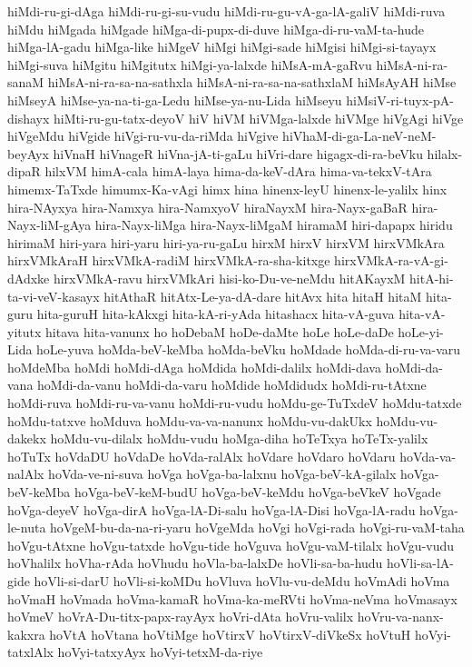 {hiMdi-ru-gi-dAga
hiMdi-ru-gi-su-vudu
hiMdi-ru-gu-vA-ga-lA-galiV
hiMdi-ruva
hiMdu
hiMgada
hiMgade
hiMga-di-pupx-di-duve
hiMga-di-ru-vaM-ta-hude
hiMga-lA-gadu
hiMga-like
hiMgeV
hiMgi
hiMgi-sade
hiMgisi
hiMgi-si-tayayx
hiMgi-suva
hiMgitu
hiMgitutx
hiMgi-ya-lalxde
hiMsA-mA-gaRvu
hiMsA-ni-ra-sanaM
hiMsA-ni-ra-sa-na-sathxla
hiMsA-ni-ra-sa-na-sathxlaM
hiMsAyAH
hiMse
hiMseyA
hiMse-ya-na-ti-ga-Ledu
hiMse-ya-nu-Lida
hiMseyu
hiMsiV-ri-tuyx-pA-dishayx
hiMti-ru-gu-tatx-deyoV
hiV
hiVM
hiVMga-lalxde
hiVMge
hiVgAgi
hiVge
hiVgeMdu
hiVgide
hiVgi-ru-vu-da-riMda
hiVgive
hiVhaM-di-ga-La-neV-neM-beyAyx
hiVnaH
hiVnageR
hiVna-jA-ti-gaLu
hiVri-dare
higagx-di-ra-beVku
hilalx-dipaR
hilxVM
himA-cala
himA-laya
hima-da-keV-dAra
hima-va-tekxV-tAra
himemx-TaTxde
himumx-Ka-vAgi
himx
hina
hinenx-leyU
hinenx-le-yalilx
hinx
hira-NAyxya
hira-Namxya
hira-NamxyoV
hiraNayxM
hira-Nayx-gaBaR
hira-Nayx-liM-gAya
hira-Nayx-liMga
hira-Nayx-liMgaM
hiramaM
hiri-dapapx
hiridu
hirimaM
hiri-yara
hiri-yaru
hiri-ya-ru-gaLu
hirxM
hirxV
hirxVM
hirxVMkAra
hirxVMkAraH
hirxVMkA-radiM
hirxVMkA-ra-sha-kitxge
hirxVMkA-ra-vA-gi-dAdxke
hirxVMkA-ravu
hirxVMkAri
hisi-ko-Du-ve-neMdu
hitAKayxM
hitA-hi-ta-vi-veV-kasayx
hitAthaR
hitAtx-Le-ya-dA-dare
hitAvx
hita
hitaH
hitaM
hita-guru
hita-guruH
hita-kAkxgi
hita-kA-ri-yAda
hitashacx
hita-vA-guva
hita-vA-yitutx
hitava
hita-vanunx
ho
hoDebaM
hoDe-daMte
hoLe
hoLe-daDe
hoLe-yi-Lida
hoLe-yuva
hoMda-beV-keMba
hoMda-beVku
hoMdade
hoMda-di-ru-va-varu
hoMdeMba
hoMdi
hoMdi-dAga
hoMdida
hoMdi-dalilx
hoMdi-dava
hoMdi-da-vana
hoMdi-da-vanu
hoMdi-da-varu
hoMdide
hoMdidudx
hoMdi-ru-tAtxne
hoMdi-ruva
hoMdi-ru-va-vanu
hoMdi-ru-vudu
hoMdu-ge-TuTxdeV
hoMdu-tatxde
hoMdu-tatxve
hoMduva
hoMdu-va-va-nanunx
hoMdu-vu-dakUkx
hoMdu-vu-dakekx
hoMdu-vu-dilalx
hoMdu-vudu
hoMga-diha
hoTeTxya
hoTeTx-yalilx
hoTuTx
hoVdaDU
hoVdaDe
hoVda-ralAlx
hoVdare
hoVdaro
hoVdaru
hoVda-va-nalAlx
hoVda-ve-ni-suva
hoVga
hoVga-ba-lalxnu
hoVga-beV-kA-gilalx
hoVga-beV-keMba
hoVga-beV-keM-budU
hoVga-beV-keMdu
hoVga-beVkeV
hoVgade
hoVga-deyeV
hoVga-dirA
hoVga-lA-Di-salu
hoVga-lA-Disi
hoVga-lA-radu
hoVga-le-nuta
hoVgeM-bu-da-na-ri-yaru
hoVgeMda
hoVgi
hoVgi-rada
hoVgi-ru-vaM-taha
hoVgu-tAtxne
hoVgu-tatxde
hoVgu-tide
hoVguva
hoVgu-vaM-tilalx
hoVgu-vudu
hoVhalilx
hoVha-rAda
hoVhudu
hoVla-ba-lalxDe
hoVli-sa-ba-hudu
hoVli-sa-lA-gide
hoVli-si-darU
hoVli-si-koMDu
hoVluva
hoVlu-vu-deMdu
hoVmAdi
hoVma
hoVmaH
hoVmada
hoVma-kamaR
hoVma-ka-meRVti
hoVma-neVma
hoVmasayx
hoVmeV
hoVrA-Du-titx-papx-rayAyx
hoVri-dAta
hoVru-valilx
hoVru-va-nanx-kakxra
hoVtA
hoVtana
hoVtiMge
hoVtirxV
hoVtirxV-diVkeSx
hoVtuH
hoVyi-tatxlAlx
hoVyi-tatxyAyx
hoVyi-tetxM-da-riye
}
